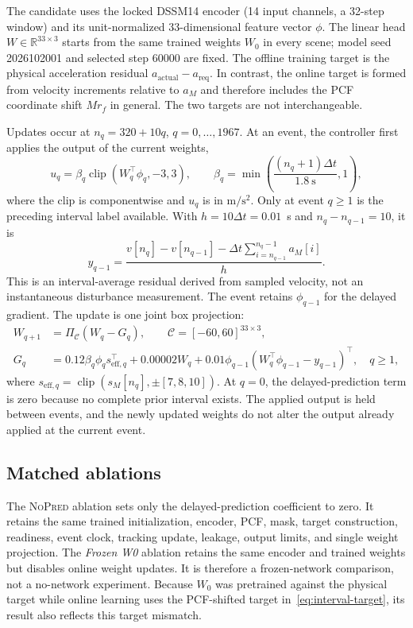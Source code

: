 \documentclass[11pt]{article}
\newcommand{\clip}{\operatorname{clip}}
\newcommand{\Cset}{\mathcal{C}}
\newcommand{\NOpred}{\textsc{NoPred}}
\begin{document}
The candidate uses the locked DSSM14 encoder (14 input channels, a 32-step window) and its unit-normalized 33-dimensional feature vector $\phi$. The linear head $W\in\mathbb{R}^{33\times3}$ starts from the same trained weights $W_0$ in every scene; model seed 2026102001 and selected step 60000 are fixed. The offline training target is the physical acceleration residual $a_{\mathrm{actual}}-a_{\mathrm{req}}$. In contrast, the online target is formed from velocity increments relative to $a_M$ and therefore includes the PCF coordinate shift $Mr_f$ in general. The two targets are not interchangeable.

Updates occur at $n_q=320+10q$, $q=0,\ldots,1967$. At an event, the controller first applies the output of the current weights,
\begin{equation}
  u_q=\beta_q\clip(W_q^\top\phi_q,-3,3),
  \qquad \beta_q=\min\!\left(\frac{(n_q+1)\Delta t}{1.8~\mathrm{s}},1\right),
\end{equation}
where the clip is componentwise and $u_q$ is in $\mathrm{m}/\mathrm{s}^2$. Only at event $q\geq1$ is the preceding interval label available. With $h=10\Delta t=0.01$~s and $n_q-n_{q-1}=10$, it is
\begin{equation}
  y_{q-1}=\frac{v[n_q]-v[n_{q-1}]
          -\Delta t\displaystyle\sum_{i=n_{q-1}}^{n_q-1}a_M[i]}{h}.
  \label{eq:interval-target}
\end{equation}
This is an interval-average residual derived from sampled velocity, not an instantaneous disturbance measurement. The event retains $\phi_{q-1}$ for the delayed gradient. The update is one joint box projection:
\begin{align}
  W_{q+1}&=\Pi_{\Cset}(W_q-G_q), \qquad
  \Cset=[-60,60]^{33\times3}, \label{eq:update}\\
  G_q&=0.12\beta_q\phi_q s_{\mathrm{eff},q}^{\top}
       +0.00002W_q
       +0.01\phi_{q-1}(W_q^{\top}\phi_{q-1}-y_{q-1})^{\top}, \quad q\geq1,
\end{align}
where $s_{\mathrm{eff},q}=\clip(s_M[n_q],\pm[7,8,10])$. At $q=0$, the delayed-prediction term is zero because no complete prior interval exists. The applied output is held between events, and the newly updated weights do not alter the output already applied at the current event.

\subsection{Matched ablations}
The \NOpred{} ablation sets only the delayed-prediction coefficient to zero. It retains the same trained initialization, encoder, PCF, mask, target construction, readiness, event clock, tracking update, leakage, output limits, and single weight projection. The \emph{Frozen W0} ablation retains the same encoder and trained weights but disables online weight updates. It is therefore a frozen-network comparison, not a no-network experiment. Because $W_0$ was pretrained against the physical target while online learning uses the PCF-shifted target in~\eqref{eq:interval-target}, its result also reflects this target mismatch.
\end{document}
